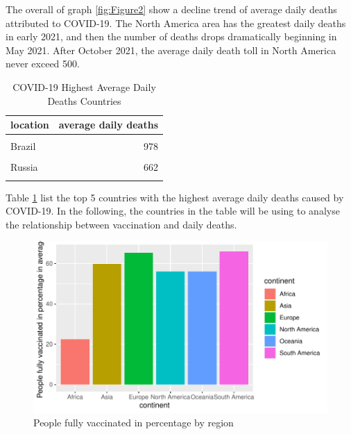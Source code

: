 \documentclass[11pt,a4paper,]{article}
\begin{document}
The overall of graph \ref{fig:Figure2} show a decline trend of average daily deaths attributed to COVID-19. The North America area has the greatest daily deaths in early 2021, and then the number of deaths drops dramatically beginning in May 2021. After October 2021, the average daily death toll in North America never exceed 500.

\begin{table}[!h]

\caption{\label{tab:Table2}COVID-19 Highest Average Daily Deaths Countries}
\centering
\begin{tabular}[t]{l|r}
\hline
location & average daily deaths\\
\hline
\cellcolor{gray!6}{United States} & \cellcolor{gray!6}{1201}\\
\hline
Brazil & 978\\
\hline
\cellcolor{gray!6}{India} & \cellcolor{gray!6}{798}\\
\hline
Russia & 662\\
\hline
\cellcolor{gray!6}{Mexico} & \cellcolor{gray!6}{396}\\
\hline
\end{tabular}
\end{table}

Table \ref{tab:Table2} list the top 5 countries with the highest average daily deaths caused by COVID-19.
In the following, the countries in the table will be using to analyse the relationship between vaccination and daily deaths.

\clearpage

\begin{figure}

{\centering \includegraphics{report_files/figure-latex/Figure3-1} 

}

\caption{People fully vaccinated in percentage by region}\label{fig:Figure3}
\end{figure}
\end{document}
